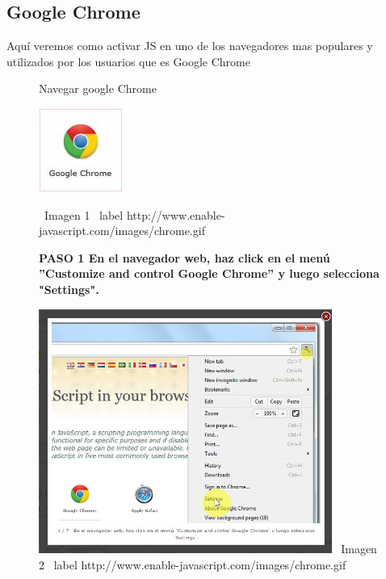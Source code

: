 \documentclass[11pt]{article} %
\begin{document}
\subsection{Google Chrome}
Aquí veremos como activar JS en uno de los navegadores mas populares y utilizados por los usuarios que es Google Chrome 

\begin{figure}
\begin{center}
\begin{center}
Navegar google Chrome
\end{center}
\includegraphics[height=3 cm, width=3 cm] {imagenes/chrome.jpg}

\ Imagen 1
\ label { http://www.enable-javascript.com/images/chrome.gif }
\newline

\begin{center}

\bf PASO 1 
 En el navegador web, haz click en el menú ''Customize and control Google Chrome'' 
y luego selecciona "Settings".
\end{center}

\includegraphics[height=8cm, width=8 cm] {imagenes/chrome 01.jpg}
\newline
\  Imagen 2
\ label { http://www.enable-javascript.com/images/chrome.gif }
\newline

\begin{center}


\end{center}
\end{center}
\end{figure}
\end{document}
